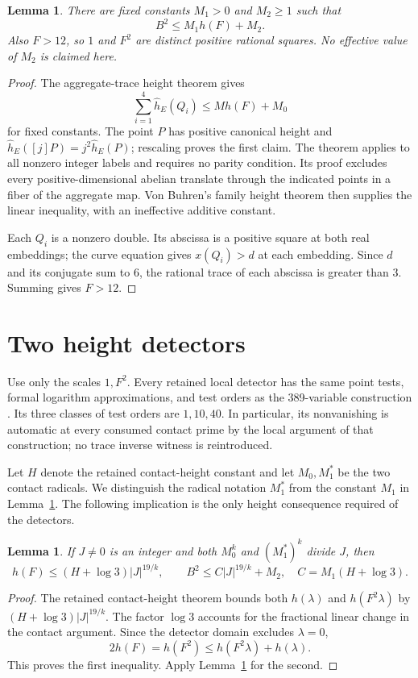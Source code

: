 \documentclass[11pt,a4paper]{article}
\newtheorem{lemma}[theorem]{Lemma}
\theoremstyle{remark}\newtheorem{remark}[theorem]{Remark}
\begin{document}
\begin{lemma}\label{lem:aggregate}
There are fixed constants $M_1>0$ and $M_2\ge1$ such that
\[
                         B^2\le M_1h(F)+M_2.
\]
Also $F>12$, so $1$ and $F^2$ are distinct positive rational squares.
No effective value of $M_2$ is claimed here.
\end{lemma}
\begin{proof}
The aggregate-trace height theorem \cite{Aggregate}
gives
\[
 \sum_{i=1}^4\widehat h_E(Q_i)\le M h(F)+M_0
\]
for fixed constants. The point $P$ has positive canonical height and
$\widehat h_E([j]P)=j^2\widehat h_E(P)$; rescaling proves the first
claim. The theorem applies to all nonzero integer labels and requires no parity condition. Its proof excludes every
positive-dimensional abelian translate through the indicated points
in a fiber of the aggregate map. Von Buhren's family height theorem
then supplies the linear inequality, with an ineffective additive
constant.

Each $Q_i$ is a nonzero double. Its abscissa is a positive square
at both real embeddings; the curve equation gives $x(Q_i)>d$ at
each embedding. Since $d$ and its conjugate sum to $6$, the rational
trace of each abscissa is greater than $3$. Summing gives $F>12$.
\end{proof}

\section{Two height detectors}
Use only the scales $1,F^2$. Every retained local detector has the
same point tests, formal logarithm approximations, and test orders
as the 389-variable construction \cite{Quartic389}. Its three
classes of test orders are $1,10,40$. In particular, its
nonvanishing is automatic at every consumed contact prime by the
local argument of that construction; no trace inverse witness is
reintroduced.

Let $H$ denote the retained contact-height constant and let
$M_0,M_1^*$ be the two contact radicals. We distinguish the radical
notation $M_1^*$ from the constant $M_1$ in
Lemma~\ref{lem:aggregate}. The following implication is the only
height consequence required of the detectors.

\begin{lemma}\label{lem:two-scales}
If $J\ne0$ is an integer and both $M_0^k$ and $(M_1^*)^k$
divide $J$, then
\[
 h(F)\le(H+\log3)|J|^{19/k},\qquad
 B^2\le C|J|^{19/k}+M_2,
 \quad C=M_1(H+\log3).
\]
\end{lemma}
\begin{proof}
The retained contact-height theorem bounds both $h(\lambda)$ and
$h(F^2\lambda)$ by $(H+\log3)|J|^{19/k}$. The factor $\log3$
accounts for the fractional linear change in the contact argument.
Since the detector domain excludes $\lambda=0$,
\[
 2h(F)=h(F^2)\le h(F^2\lambda)+h(\lambda).
\]
This proves the first inequality. Apply
Lemma~\ref{lem:aggregate} for the second.
\end{proof}
\end{document}
